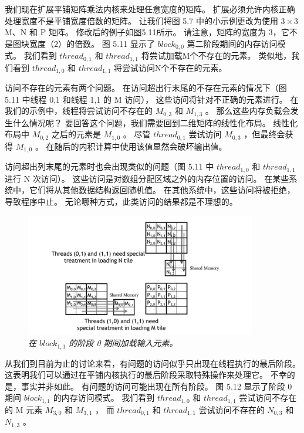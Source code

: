 我们现在扩展平铺矩阵乘法内核来处理任意宽度的矩阵。 扩展必须允许内核正确处理宽度不是平铺宽度倍数的矩阵。 
让我们将图 5.7 中的小示例更改为使用 $3 \times 3$ M、N 和 P 矩阵。 修改后的例子如图5.11所示。 
请注意，矩阵的宽度为 3，它不是图块宽度（2）的倍数。 图 5.11 显示了 $block_{0,0}$ 第二阶段期间的内存访问模式。 
我们看到 $thread_{0,1}$ 和 $thread_{1,1}$ 将尝试加载M个不存在的元素。 
类似地，我们看到 $thread_{1,0}$ 和 $thread_{1,1}$ 将尝试访问N个不存在的元素。

访问不存在的元素有两个问题。 在访问超出行末尾的不存在元素的情况下（图 5.11 中线程 0,1 和线程 1,1 的 M 访问），
这些访问将针对不正确的元素进行。 在我们的示例中，线程将尝试访问不存在的 $M_{0,3}$ 和 $M_{1,3}$ 。 
那么这些内存负载会发生什么情况呢？ 要回答这个问题，我们需要回到二维矩阵的线性化布局。 
线性化布局中 $M_{0,2}$ 之后的元素是 $M_{1,0}$ 。 
尽管 $thread_{0,1}$ 尝试访问 $M_{0,3}$ ，但最终会获得 $M_{1,0}$ 。 
在随后的内积计算中使用该值显然会破坏输出值。

访问超出列末尾的元素时也会出现类似的问题（图 5.11 中 $thread_{1,0}$ 和 $thread_{1,1}$ 进行 N 次访问）。 
这些访问是对数组分配区域之外的内存位置的访问。 在某些系统中，它们将从其他数据结构返回随机值。 
在其他系统中，这些访问将被拒绝，导致程序中止。 无论哪种方式，此类访问的结果都是不理想的。

\begin{figure}[H]
	\centering
	\includegraphics[width=0.9\textwidth]{figs/F5.12.png}
	\caption{\textit{在 $block_{1,1}$ 的阶段 0 期间加载输入元素。}}
\end{figure}

从我们到目前为止的讨论来看，有问题的访问似乎只出现在线程执行的最后阶段。 
这表明我们可以通过在平铺内核执行的最后阶段采取特殊操作来处理它。 不幸的是，事实并非如此。 
有问题的访问可能出现在所有阶段。 图 5.12 显示了阶段 0 期间 $block_{1,1}$ 的内存访问模式。
我们看到 $thread_{1,0}$ 和 $thread_{1,1}$ 尝试访问不存在的 M 元素 $M_{3,0}$ 和 $M_{3,1}$ ，
而 $thread_{0,1}$ 和 $thread_{1,1}$ 尝试访问不存在的 $N_{0,3}$ 和 $N_{1,3}$ 。

